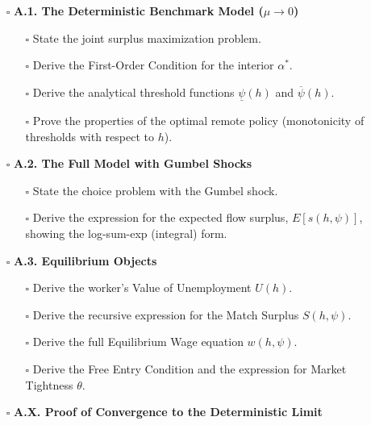\documentclass[
  11pt,
  letterpaper,
  DIV=11,
  numbers=noendperiod]{scrartcl}
\providecommand{\tightlist}{%
  \setlength{\itemsep}{0pt}\setlength{\parskip}{0pt}}\usepackage{longtable,booktabs,array}
\begin{document}
\begin{itemize}
\tightlist
\item[$\square$]
  \textbf{A.1. The Deterministic Benchmark Model (\(\mu \to 0\))}

  \begin{itemize}
  \tightlist
  \item[$\square$]
    State the joint surplus maximization problem.
  \item[$\square$]
    Derive the First-Order Condition for the interior \(\alpha^*\).
  \item[$\square$]
    Derive the analytical threshold functions \(\underline{\psi}(h)\)
    and \(\overline{\psi}(h)\).
  \item[$\square$]
    Prove the properties of the optimal remote policy (monotonicity of
    thresholds with respect to \(h\)).
  \end{itemize}
\item[$\square$]
  \textbf{A.2. The Full Model with Gumbel Shocks}

  \begin{itemize}
  \tightlist
  \item[$\square$]
    State the choice problem with the Gumbel shock.
  \item[$\square$]
    Derive the expression for the expected flow surplus,
    \(E[s(h,\psi)]\), showing the log-sum-exp (integral) form.
  \end{itemize}
\item[$\square$]
  \textbf{A.3. Equilibrium Objects}

  \begin{itemize}
  \tightlist
  \item[$\square$]
    Derive the worker's Value of Unemployment \(U(h)\).
  \item[$\square$]
    Derive the recursive expression for the Match Surplus \(S(h,\psi)\).
  \item[$\square$]
    Derive the full Equilibrium Wage equation \(w(h,\psi)\).
  \item[$\square$]
    Derive the Free Entry Condition and the expression for Market
    Tightness \(\theta\).
  \end{itemize}
\item[$\square$]
  \textbf{A.X. Proof of Convergence to the Deterministic Limit}


\end{itemize}
\end{document}
